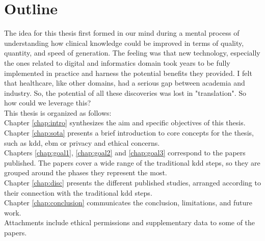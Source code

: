 \chapter*{Outline}


The idea for this thesis first formed in our mind during a mental process of understanding how clinical knowledge could be improved in terms of quality, quantity, and speed of generation. The feeling was that new technology, especially the ones related to digital and informatics domain took years to be fully implemented in practice and harness the potential benefits they provided. I felt that healthcare, like other domains, had a serious gap between academia and industry. So, the potential of all these discoveries was lost in "translation".
So how could we leverage this? \\
This thesis is organized as follows:\\
Chapter \ref{chap:intro} synthesizes the aim and specific objectives of this thesis.
Chapter \ref{chap:sota} presents a brief introduction to core concepts for the thesis, such as \ac{kdd}, \ac{ebm} or privacy and ethical concerns.\\
Chapters \ref{chap:goal1}, \ref{chap:goal2} and \ref{chap:goal3} correspond to the papers published. The papers cover a wide range of the traditional \ac{kdd} steps, so they are grouped around the phases they represent the most.\\

Chapter \ref{chap:disc}  presents the different published studies, arranged according to their connection with the traditional \ac{kdd} steps.\\

Chapter \ref{chap:conclusion} communicates the conclusion, limitations, and future work.\\

Attachments include ethical permissions and supplementary data to some of the papers.

